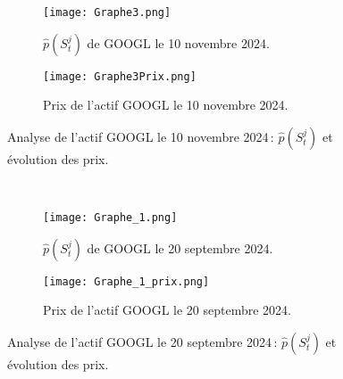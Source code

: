 \documentclass[12pt,a4paper]{article}
\theoremstyle{definition}
\theoremstyle{remark}
\begin{document}
 \\
\\
\\
\\
\\
\begin{figure}[h!]
    \centering
    \begin{subfigure}[b]{0.40\textwidth}
        \centering
        \texttt{[image: Graphe3.png]}
        \caption{$\hat{p}(S_t^j)$ de GOOGL le 10 novembre 2024.}
        \label{fig:graphe3}
    \end{subfigure}
    \hfill
    \begin{subfigure}[b]{0.40\textwidth}
        \centering
        \texttt{[image: Graphe3Prix.png]}
        \caption{Prix de l'actif GOOGL le 10 novembre 2024.}
        \label{fig:graphe3Prix}
    \end{subfigure}

    \caption{Analyse de l'actif GOOGL le 10 novembre 2024 : $\hat{p}(S_t^j)$ et évolution des prix.}
    \label{fig:comparison}
\end{figure}
\\

\begin{figure}[h!]
    \centering
    \begin{subfigure}[b]{0.40\textwidth}
        \centering
        \texttt{[image: Graphe\_1.png]}
        \caption{$\hat{p}(S_t^j)$ de GOOGL le 20 septembre 2024.}
        \label{fig:graphe1}
    \end{subfigure}
    \hfill
    \begin{subfigure}[b]{0.40\textwidth}
        \centering
        \texttt{[image: Graphe\_1\_prix.png]}
        \caption{Prix de l'actif GOOGL le 20 septembre  2024.}
        \label{fig:graphe2}
    \end{subfigure}

    \caption{Analyse de l'actif GOOGL le 20 septembre  2024 : $\hat{p}(S_t^j)$ et évolution des prix.}
    \label{fig:side_by_side}
\end{figure}
\end{document}
